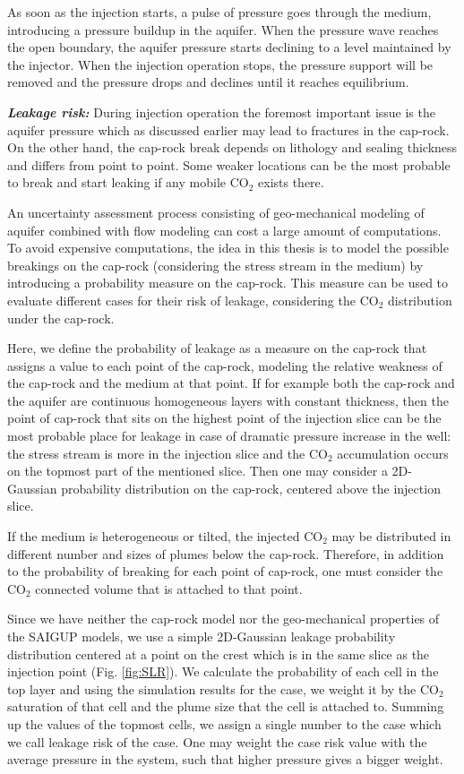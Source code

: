 As soon as the injection starts, a pulse of pressure goes through the
medium, introducing
a pressure buildup in the aquifer. When the pressure wave reaches the open
boundary, the aquifer pressure starts declining to a level maintained by the
injector. When the injection operation stops, the pressure support will be
removed and the pressure drops and declines until it reaches equilibrium.

\textbf{\textit{Leakage risk:}} During injection operation the foremost
important issue is the aquifer pressure
which as discussed earlier may lead to fractures in the cap-rock. On the other
hand, the cap-rock break depends on lithology and sealing thickness and differs
from point to point. Some weaker locations can be the most probable to
break and start leaking if any mobile CO$_2$ exists there.

An uncertainty assessment process consisting of geo-mechanical modeling of aquifer combined with flow modeling can cost a large amount of computations. To avoid expensive computations, the idea in this thesis is to model the possible breakings on the cap-rock (considering the stress stream in the medium) by introducing a probability measure on the cap-rock. This measure can be used to
evaluate different cases for their risk of leakage, considering the CO$_2$
distribution under the cap-rock. 

Here, we define the probability of leakage as a measure on the cap-rock that
assigns a value to each point of the cap-rock, modeling the relative weakness of
the cap-rock and the medium at that point. If for example both the cap-rock and
the aquifer are continuous homogeneous layers with constant thickness, then the
point of cap-rock that sits on the highest point of the injection slice can be
the most probable place for leakage in case of dramatic pressure increase in the
well: the stress stream is more in the injection slice and the CO$_2$
accumulation occurs on the topmost part of the mentioned slice. Then one may
consider a 2D-Gaussian probability distribution on the cap-rock, centered above
the injection slice.

If the medium is heterogeneous or tilted, the injected CO$_2$ may be distributed
in different number and sizes of plumes below the cap-rock. Therefore, in
addition to the probability of breaking for each point of cap-rock, one must
consider the CO$_2$ connected volume that is attached to that point. 

Since we have neither the cap-rock model nor the geo-mechanical properties of
the SAIGUP models, we use a simple 2D-Gaussian leakage probability distribution
centered at a point on the crest which is in the same slice as the injection
point (Fig. \ref{fig:SLR}). We calculate the probability of each cell in the top
layer and using the simulation results for the case, we weight it by the CO$_2$
saturation of that cell and the plume size that the cell is attached to.
Summing up the values of the topmost cells, we assign a single number to the
case which we call leakage risk of the case. One may weight the case risk value
with the average pressure in the system, such that higher pressure gives a
bigger weight.
\vskip 0.5cm

